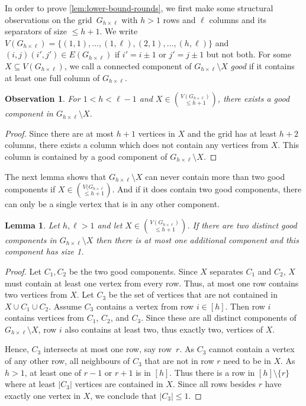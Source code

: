 \documentclass[10pt,a4paper]{article}
\newtheorem{lemma}[theorem]{Lemma}
\newcommand{\grid}[2]{\ensuremath{G_{#1 \times #2}}}
\newtheorem{observation}[theorem]{Observation}
\begin{document}
In order to prove \cref{lem:lower-bound-rounds}, we first make some structural observations on the grid~\grid{h}{\ell} with $h>1$ rows and $\ell$ columns and its separators of size $\leq h+1$.
We write $V(\grid{h}{\ell})=\{(1,1),\ldots,(1,\ell),(2,1),\ldots,(h,\ell)\}$ and $(i,j)(i',j')\in E(\grid{h}{\ell})$ if $i'=i\pm 1$ or $j'=j\pm 1$ but not both.
For some $X\subseteq V(\grid{h}{\ell})$, we call a connected component of $\grid{h}{\ell}\setminus X$ \emph{good} if it contains at least one full column of \grid{h}{\ell}.

\begin{observation} \label{obs:good-component}
	For $1 < h < \ell - 1$ and $X\in \binom{V(\grid{h}{\ell})}{\leq h+1}$, there exists a good component in $\grid{h}{\ell} \setminus X$.
\end{observation}
\begin{proof}
	Since there are at most $h+1$ vertices in $X$ and the grid has at least $h+2$ columns, there exists a column which does not contain any vertices from $X$. This column is contained by a good component of $\grid{h}{\ell} \setminus X$.
\end{proof}
The next lemma shows that $\grid{h}{\ell}\setminus X$ can never contain more than two good components if $X\in\binom{V(\grid{h}{\ell}}{\leq h+1}$.
And if it does contain two good components, there can only be a single vertex that is in any other component.

\begin{lemma}
	\label{lem:third-comp-single}
	Let $h,\ell>1$ and let $X\in \binom{V(\grid{h}{\ell})}{\leq h+1}$. If there are two distinct good components in $\grid{h}{\ell}\setminus X$ then there is at most one additional component and this component has size 1.
\end{lemma}

\begin{proof}
	Let $C_1,C_2$ be the two good components.
	Since $X$ separates $C_1$ and $C_2$, $X$ must contain at least one vertex from every row. Thus, at most one row contains two vertices from $X$.
	Let $C_3$ be the set of vertices that are not contained in $X\cup C_1\cup C_2$.
	Assume $C_3$ contains a vertex from row $i\in[h]$.
	Then row $i$ contains vertices from $C_1$, $C_2$, and $C_3$. 
	Since these are all distinct components of $\grid{h}{\ell}\setminus X$, row $i$ also contains at least two, thus exactly two, vertices of $X$.
	
	Hence, $C_3$ intersects at most one row, say row~$r$.
	As $C_3$ cannot contain a vertex of any other row, all neighbours of $C_3$ that are not in row $r$ need to be in $X$.
	As $h>1$, at least one of $r-1$ or $r+1$ is in $[h]$.
	Thus there is a row in $[h]\setminus \{r\}$ where at least $|C_3|$ vertices are contained in $X$.
	Since all rows besides $r$ have exactly one vertex in $X$, we conclude that $|C_3|\leq 1$.
\end{proof}
\end{document}
